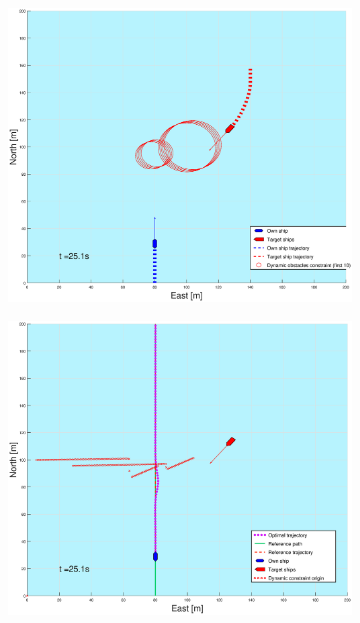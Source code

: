 \begin{figure}[ht!] %
    \begin{subfigure}[b]{0.49\textwidth}
        \centering
        \includegraphics[width=\textwidth]{Images/Figures/sving_GW/_Simple_0fig1_time=25}
    \end{subfigure}
    \hfill
    \begin{subfigure}[b]{0.499\textwidth}
        \centering
        \includegraphics[width=\textwidth]{Images/Figures/sving_GW/_Simple_0fig999_time=25}

\end{subfigure}
\end{figure}
